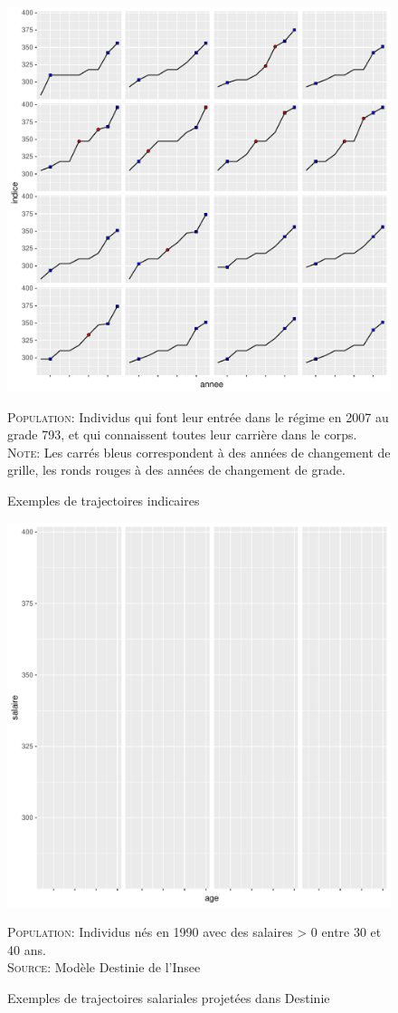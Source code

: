 \documentclass[11pt,a4paper]{article}
\begin{document}
\begin{figure}[H] 
\caption{Exemples de trajectoires indicaires}
\label{trajectories} 
\includegraphics[width=1\linewidth]{trajectoires.pdf} 
\begin{minipage}{15cm}
\footnotesize
\textsc{Population:} Individus qui font leur entrée dans le régime en 2007 au grade 793, et qui connaissent toutes leur carrière dans le corps. \\
\textsc{Note:} Les carrés bleus correspondent à des années de changement de grille, les ronds rouges à des années de changement de grade. 
\end{minipage}
\end{figure}



\begin{figure}[H] 
\caption{Exemples de trajectoires salariales projetées dans Destinie}
\label{trajectories_D} 
\includegraphics[width=1\linewidth, height = 0.5\linewidth]{trajectoires_D.pdf} 
\begin{minipage}{12cm}
\footnotesize
\textsc{Population:} Individus nés en 1990 avec des salaires > 0 entre 30 et 40 ans. \\
\textsc{Source:} Modèle Destinie de l'Insee
\end{minipage}
\end{figure}
\end{document}
